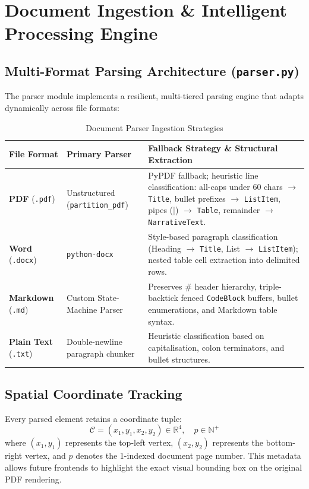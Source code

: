 \documentclass[11pt,a4paper]{article}
\begin{document}
\section{Document Ingestion \& Intelligent Processing Engine}

\subsection{Multi-Format Parsing Architecture (\texttt{parser.py})}
The parser module implements a resilient, multi-tiered parsing engine that adapts dynamically across file formats:

\begin{table}[h!]
\centering
\small
\begin{tabularx}{\textwidth}{llX}
\toprule
\textbf{File Format} & \textbf{Primary Parser} & \textbf{Fallback Strategy \& Structural Extraction} \\
\midrule
\textbf{PDF} (\texttt{.pdf}) & Unstructured (\texttt{partition\_pdf}) & PyPDF fallback; heuristic line classification: all-caps under 60 chars $\rightarrow$ \texttt{Title}, bullet prefixes $\rightarrow$ \texttt{ListItem}, pipes ($|$) $\rightarrow$ \texttt{Table}, remainder $\rightarrow$ \texttt{NarrativeText}. \\
\textbf{Word} (\texttt{.docx}) & \texttt{python-docx} & Style-based paragraph classification (Heading $\rightarrow$ \texttt{Title}, List $\rightarrow$ \texttt{ListItem}); nested table cell extraction into delimited rows. \\
\textbf{Markdown} (\texttt{.md}) & Custom State-Machine Parser & Preserves \# header hierarchy, triple-backtick fenced \texttt{CodeBlock} buffers, bullet enumerations, and Markdown table syntax. \\
\textbf{Plain Text} (\texttt{.txt}) & Double-newline paragraph chunker & Heuristic classification based on capitalisation, colon terminators, and bullet structures. \\
\bottomrule
\end{tabularx}
\caption{Document Parser Ingestion Strategies}
\end{table}

\subsection{Spatial Coordinate Tracking}
Every parsed element retains a coordinate tuple:
\begin{equation}
\mathcal{C} = (x_1, y_1, x_2, y_2) \in \mathbb{R}^4, \quad p \in \mathbb{N}^+
\end{equation}
where $(x_1, y_1)$ represents the top-left vertex, $(x_2, y_2)$ represents the bottom-right vertex, and $p$ denotes the 1-indexed document page number. This metadata allows future frontends to highlight the exact visual bounding box on the original PDF rendering.
\end{document}
